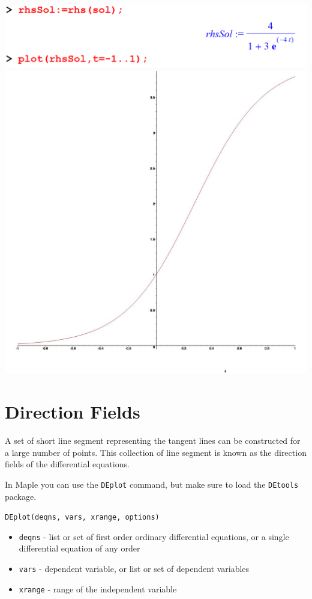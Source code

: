 \documentclass[
]{book}
\providecommand{\tightlist}{%
  \setlength{\itemsep}{0pt}\setlength{\parskip}{0pt}}
\theoremstyle{definition}
\theoremstyle{definition}
\theoremstyle{definition}
\theoremstyle{definition}
\theoremstyle{remark}
\begin{document}
\includegraphics{figures/Diff/Diff 6.2 -11.png}
\includegraphics{figures/Diff/Diff 6.2 -10.jpg}

\section{Direction Fields}\label{direction-fields}

A set of short line segment representing the tangent lines can be constructed for a large number of points. This collection of line segment is known as the direction fields of the
differential equations.

In Maple you can use the \texttt{DEplot} command, but make sure to load the \texttt{DEtools} package.

\texttt{DEplot(deqns,\ vars,\ xrange,\ options)}

\begin{itemize}
\tightlist
\item
  \texttt{deqns} - list or set of first order ordinary differential equations, or a single differential
  equation of any order
\item
  \texttt{vars} - dependent variable, or list or set of dependent variables
\item
  \texttt{xrange} - range of the independent variable
\end{itemize}
\end{document}

